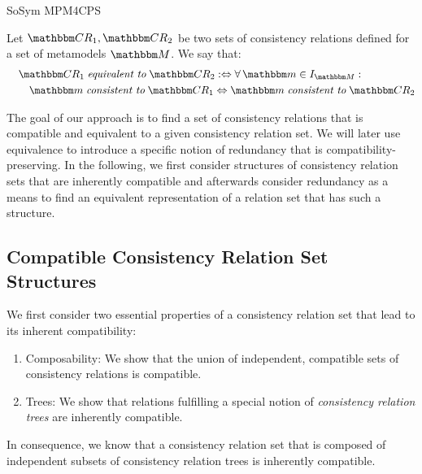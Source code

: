 \begin{copiedFrom}{SoSym MPM4CPS}
\begin{definition}
\label{def:equivalence}
    Let $\consistencyrelationset{CR}_{1}, \consistencyrelationset{CR}_{2}$ be two sets of consistency relations defined for a set of metamodels $\metamodelset{M}$. %
    We say that:
    \begin{align*}
        \formulaskip
        &
        \consistencyrelationset{CR}_{1} \equivalenttomath \consistencyrelationset{CR}_{2} \equivalentperdefinition \forall \modelset{m} \in \metamodelinstances{\metamodelset{M}} : \\
        & \formulaskip%
        \modelset{m} \consistenttomath \consistencyrelationset{CR}_{1} \equivalent \modelset{m} \consistenttomath \consistencyrelationset{CR}_{2}
    \end{align*}
\end{definition}


The goal of our approach is to find a set of consistency relations that is compatible and equivalent to a given consistency relation set.
We will later use equivalence to introduce a specific notion of redundancy that is compatibility-preserving.
In the following, we first consider structures of consistency relation sets that are inherently compatible and afterwards consider redundancy as a means to find an equivalent representation of a relation set that has such a structure.



\subsection{Compatible Consistency Relation Set Structures}

We first consider two essential properties of a consistency relation set that lead to its inherent compatibility:
\begin{enumerate}
    \item Composability: We show that the union of independent, compatible sets of consistency relations is compatible.
    \item Trees: We show that relations fulfilling a special notion of \emph{consistency relation trees} are inherently compatible.
\end{enumerate}
In consequence, we know that a consistency relation set that is composed of independent subsets of consistency relation trees is inherently compatible.


\end{copiedFrom}
